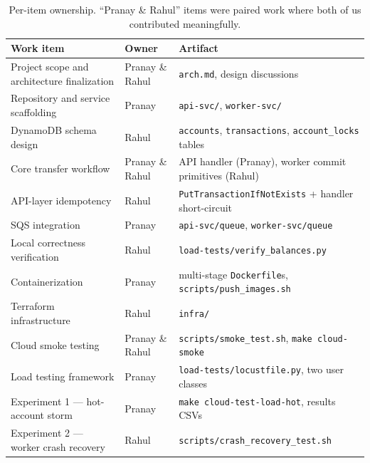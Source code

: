 \documentclass[11pt,a4paper]{article}
\begin{document}
\begin{table}[h]
\centering
\small
\renewcommand{\arraystretch}{1.22}
\caption{Per-item ownership. ``Pranay \& Rahul'' items were paired work where both of us contributed meaningfully.}
\label{tab:ownership}
\begin{tabular}{>{\raggedright\arraybackslash}p{5.6cm} >{\raggedright\arraybackslash}p{3.6cm} >{\raggedright\arraybackslash}p{5.2cm}}
\toprule
\rowcolor{boxblue}
\textbf{Work item} & \textbf{Owner} & \textbf{Artifact} \\
\midrule
Project scope and architecture finalization & Pranay \& Rahul & \texttt{arch.md}, design discussions \\
Repository and service scaffolding          & Pranay          & \texttt{api-svc/}, \texttt{worker-svc/} \\
DynamoDB schema design                      & Rahul           & \texttt{accounts}, \texttt{transactions}, \texttt{account\_locks} tables \\
Core transfer workflow                      & Pranay \& Rahul & API handler (Pranay), worker commit primitives (Rahul) \\
API-layer idempotency                       & Rahul           & \texttt{PutTransactionIfNotExists} + handler short-circuit \\
SQS integration                             & Pranay          & \texttt{api-svc/queue}, \texttt{worker-svc/queue} \\
Local correctness verification              & Rahul           & \texttt{load-tests/verify\_balances.py} \\
Containerization                            & Pranay          & multi-stage \texttt{Dockerfile}s, \texttt{scripts/push\_images.sh} \\
Terraform infrastructure                    & Rahul           & \texttt{infra/} \\
Cloud smoke testing                         & Pranay \& Rahul & \texttt{scripts/smoke\_test.sh}, \texttt{make cloud-smoke} \\
Load testing framework                      & Pranay          & \texttt{load-tests/locustfile.py}, two user classes \\
Experiment 1 --- hot-account storm          & Pranay          & \texttt{make cloud-test-load-hot}, results CSVs \\
Experiment 2 --- worker crash recovery      & Rahul           & \texttt{scripts/crash\_recovery\_test.sh} \\

\end{tabular}
\end{table}
\end{document}
